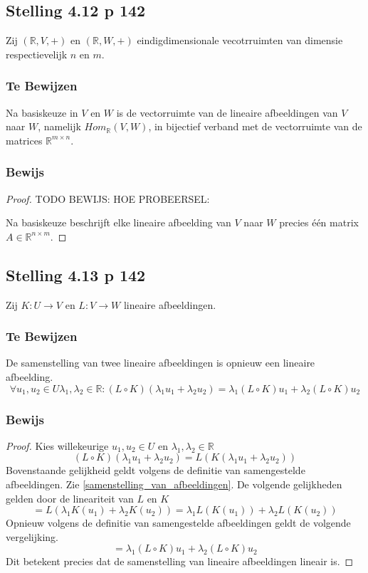 \documentclass[lineaire_algebra_oplossingen.tex]{subfiles}
\begin{document}
\subsection{Stelling 4.12 p 142}
Zij $(\mathbb{R},V,+)$ en  $(\mathbb{R},W,+)$ eindigdimensionale vecotrruimten van dimensie respectievelijk $n$ en $m$.
\subsubsection*{Te Bewijzen}
Na basiskeuze in $V$ en $W$ is de vectorruimte van de lineaire afbeeldingen van $V$ naar $W$, namelijk $Hom_{\mathbb{R}}(V,W)$, in bijectief verband met de vectorruimte van de matrices $\mathbb{R}^{m\times n}$.
\subsubsection*{Bewijs}
\begin{proof}
TODO BEWIJS: HOE
PROBEERSEL:

Na basiskeuze beschrijft elke lineaire afbeelding van $V$ naar $W$ precies \'e\'en matrix $A\in \mathbb{R}^{n\times m}$.
\end{proof}

\subsection{Stelling 4.13 p 142}
Zij $K:U\rightarrow V$ en $L:V\rightarrow W$ lineaire afbeeldingen.
\subsubsection*{Te Bewijzen}
De samenstelling van twee lineaire afbeeldingen is opnieuw een lineaire afbeelding.
\[
\forall u_1,u_2\in U \lambda_1,\lambda_2\in\mathbb{R}: (L\circ K)(\lambda_1u_1 + \lambda_2u_2) = \lambda_1(L\circ K)u_1 + \lambda_2(L\circ K)u_2
\]
\subsubsection*{Bewijs}
\begin{proof}
Kies willekeurige $u_1,u_2\in U$ en $\lambda_1,\lambda_2\in\mathbb{R}$
\[
(L\circ K)(\lambda_1u_1 + \lambda_2u_2) = L(K(\lambda_1u_1 + \lambda_2u_2))
\]
Bovenstaande gelijkheid geldt volgens de definitie van samengestelde afbeeldingen. Zie \ref{samenstelling_van_afbeeldingen}. De volgende gelijkheden gelden door de lineariteit van $L$ en $K$
\[
= L(\lambda_1K(u_1) + \lambda_2K(u_2)) = \lambda_1L(K(u_1)) + \lambda_2L(K(u_2))
\]
Opnieuw volgens de definitie van samengestelde afbeeldingen geldt de volgende vergelijking.
\[
= \lambda_1(L\circ K)u_1 + \lambda_2(L\circ K)u_2
\]
Dit betekent precies dat de samenstelling van lineaire afbeeldingen lineair is.
\end{proof}
\end{document}
